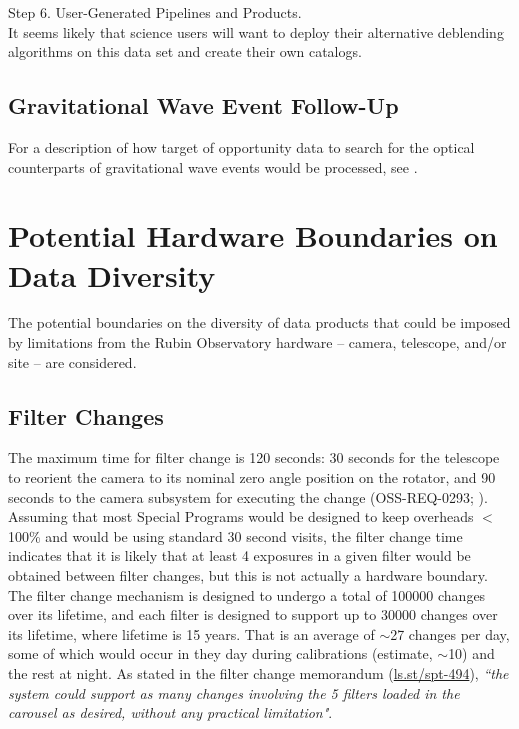 \documentclass[DM,lsstdoc,toc]{lsstdoc}
\begin{document}
Step 6. User-Generated Pipelines and Products. \\
It seems likely that science users will want to deploy their alternative deblending algorithms on this data set and create their own catalogs.

\subsection{Gravitational Wave Event Follow-Up}\label{ssec:SPCS_GW}

For a description of how target of opportunity data to search for the optical counterparts of gravitational wave events would be processed, see .

\clearpage


\clearpage
\appendix

\section{Potential Hardware Boundaries on Data Diversity}\label{sec:hardbounds}

The potential boundaries on the diversity of data products that could be imposed by limitations from the Rubin Observatory hardware -- camera, telescope, and/or site -- are considered.

\subsection{Filter Changes}
The maximum time for filter change is 120 seconds: 30 seconds for the telescope to reorient the camera to its nominal zero angle position on the rotator, and 90 seconds to the camera subsystem for executing the change (OSS-REQ-0293; ).
Assuming that most Special Programs would be designed to keep overheads $<$100\% and would be using standard 30 second visits, the filter change time indicates that it is likely that at least 4 exposures in a given filter would be obtained between filter changes, but this is not actually a hardware boundary. 
The filter change mechanism is designed to undergo a total of 100000 changes over its lifetime, and each filter is designed to support up to 30000 changes over its lifetime, where lifetime is 15 years.
That is an average of $\sim$27 changes per day, some of which would occur in they day during calibrations (estimate, $\sim$10) and the rest at night.
As stated in the filter change memorandum (\url{ls.st/spt-494}), {\it ``the system could support as many changes involving the 5 filters loaded in the carousel as desired, without any practical limitation"}.
\end{document}
